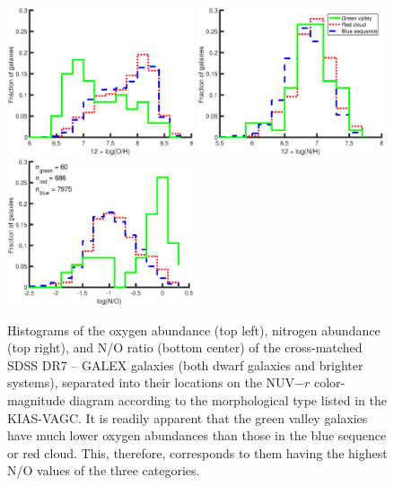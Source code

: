 \begin{figure}
    \includegraphics[width=0.49\textwidth]{Images/GV/Z12logOH_I06relations_SF_t3}
    \includegraphics[width=0.49\textwidth]{Images/GV/N12logNH_I06relations_SF_t3}
    \includegraphics[width=0.49\textwidth]{Images/GV/logNO_I06relations_SF_t3}
    \caption[Distribution of gas-phase chemical abundances in cross-matched SDSS 
    DR7 -- GALEX galaxies]{Histograms of the oxygen abundance (top left), 
    nitrogen abundance (top right), and N/O ratio (bottom center) of the 
    cross-matched SDSS DR7 -- GALEX galaxies (both dwarf galaxies and brighter 
    systems), separated into their locations on the NUV$-r$ color-magnitude 
    diagram according to the morphological type listed in the KIAS-VAGC.  It is 
    readily apparent that the green valley galaxies have much lower oxygen 
    abundances than those in the blue sequence or red cloud.  This, therefore, 
    corresponds to them having the highest N/O values of the three categories.}
    \label{fig:Z_hist}
\end{figure}

